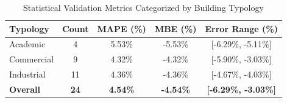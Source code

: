 \begin{table}[t]
\centering
\caption{Statistical Validation Metrics Categorized by Building Typology}
\label{tab:error_metrics}
\footnotesize
\setlength{\tabcolsep}{3.0pt}
\begin{tabular}{lcccc}
\toprule
\textbf{Typology} & \textbf{Count} & \textbf{MAPE (\%)} & \textbf{MBE (\%)} & \textbf{Error Range (\%)} \\
\midrule
Academic & 4 & 5.53\% & -5.53\% & [-6.29\%, -5.11\%] \\
Commercial & 9 & 4.32\% & -4.32\% & [-5.90\%, -3.03\%] \\
Industrial & 11 & 4.36\% & -4.36\% & [-4.67\%, -4.03\%] \\
\midrule
\textbf{Overall} & \textbf{24} & \textbf{4.54\%} & \textbf{-4.54\%} & \textbf{[-6.29\%, -3.03\%]} \\
\bottomrule
\end{tabular}
\end{table}